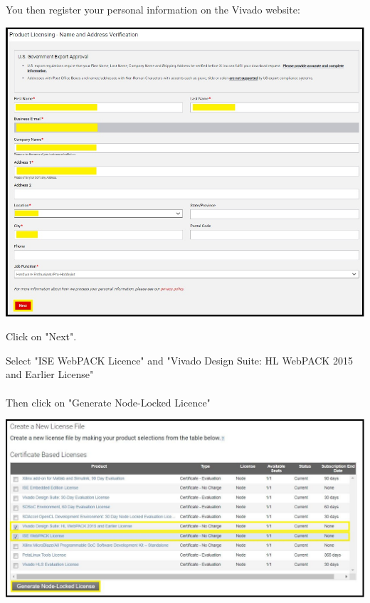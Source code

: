 \begin{minipage}{\linewidth}
  You then register your personal information on the Vivado website:
  \\
  \begin{center}
    \includegraphics[width=0.7\linewidth]{images/VivadoInstimg025.jpg}
  \end{center}
  Click on "Next".
\end{minipage}


\begin{minipage}{\linewidth}
Select "ISE WebPACK Licence" and "Vivado Design Suite: HL WebPACK 2015 and Earlier License" \\
\\
Then click on "Generate Node-Locked Licence"
\\
\begin{center}
  \includegraphics[width=\linewidth]{images/VivadoInstimg026.jpg}
\end{center}
\end{minipage}

